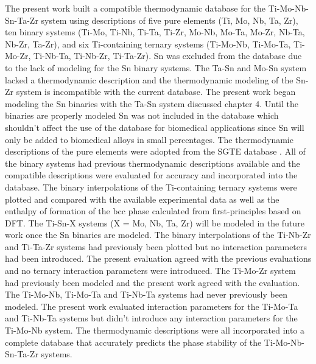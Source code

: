 The present work built a compatible thermodynamic database for the Ti-Mo-Nb-Sn-Ta-Zr system using descriptions of five pure elements (Ti, Mo, Nb, Ta, Zr), ten binary systems (Ti-Mo, Ti-Nb, Ti-Ta, Ti-Zr, Mo-Nb, Mo-Ta, Mo-Zr, Nb-Ta, Nb-Zr, Ta-Zr), and six Ti-containing ternary systems (Ti-Mo-Nb, Ti-Mo-Ta, Ti-Mo-Zr, Ti-Nb-Ta, Ti-Nb-Zr, Ti-Ta-Zr). Sn was excluded from the database due to the lack of modeling for the Sn binary systems. The Ta-Sn and Mo-Sn system lacked a thermodynamic description and the thermodynamic modeling of the Sn-Zr system is incompatible with the current database. The present work began modeling the Sn binaries with the Ta-Sn system discussed chapter 4. Until the binaries are properly modeled Sn was not included in the database which shouldn't affect the use of the database for biomedical applications since Sn will only be added to biomedical alloys in small percentages. The thermodynamic descriptions of the pure elements were adopted from the SGTE database \cite{Dinsdale1991}. All of the binary systems had previous thermodynamic descriptions available and the compatible descriptions were evaluated for accuracy and incorporated into the database. The binary interpolations of the Ti-containing ternary systems were plotted and compared with the available experimental data as well as the enthalpy of formation of the bcc phase calculated from first-principles based on DFT. The Ti-Sn-X systems (X = Mo, Nb, Ta, Zr) will be modeled in the future work once the Sn binaries are modeled. The binary interpolations of the Ti-Nb-Zr and Ti-Ta-Zr systems had previously been plotted but no interaction parameters had been introduced. The present evaluation agreed with the previous evaluations and no ternary interaction parameters were introduced. The Ti-Mo-Zr system had previously been modeled and the present work agreed with the evaluation. The Ti-Mo-Nb, Ti-Mo-Ta and Ti-Nb-Ta systems had never previously been modeled. The present work evaluated interaction parameters for the Ti-Mo-Ta and Ti-Nb-Ta systems but didn't introduce any interaction parameters for the Ti-Mo-Nb system. The thermodynamic descriptions were all incorporated into a complete database that accurately predicts the phase stability of the Ti-Mo-Nb-Sn-Ta-Zr systems.


